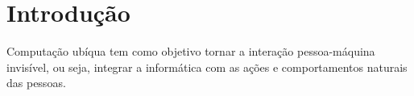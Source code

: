 \textual

\chapter{Introdução}
	
	Computação ubíqua tem como objetivo tornar a interação pessoa-máquina invisível, ou seja, integrar a informática com as ações e comportamentos naturais das pessoas.
